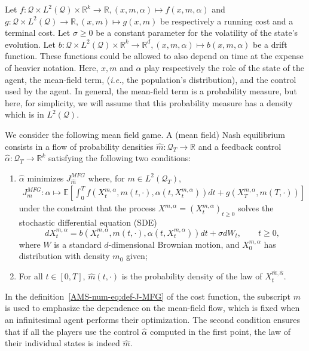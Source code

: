 \documentclass{amsproc}
\theoremstyle{definition}
\theoremstyle{remark}
\numberwithin{equation}{section}
\newcommand{\EE}{{\mathbb E}}
\newcommand{\RR}{{\mathbb R}}
\newcommand{\ctrl}{\alpha}
\newcommand{\ctrldim}{k}
\newcommand{\dom}{\mathcal{Q}}
\newcommand{\domT}{\mathcal{Q}_{T}}
\begin{document}
Let $f: \dom \times L^2(\dom) \times \RR^\ctrldim \to \RR, (x,m,\ctrl) \mapsto f(x,m,\ctrl)$ and $g: \dom \times L^2(\dom) \to \RR, (x,m) \mapsto g(x,m)$ be respectively a running cost and a terminal cost. Let $\sigma \ge 0$ be a constant parameter for the volatility of the state's evolution.  Let $b:  \dom \times L^2(\dom) \times \RR^\ctrldim \to \RR^d, (x,m,\ctrl) \mapsto b(x,m,\ctrl)$ be a drift function.  These functions could be allowed to also depend on time at the expense of heavier notation. Here, $x,m$ and $\ctrl$ play respectively the role of the state of the agent, the mean-field term, (\textit{i.e.}, the population's distribution), and the control used by the agent. In general, the mean-field term is a probability measure, but here, for simplicity, we will assume that this probability measure has a density which is in $L^2(\dom)$. 

We consider the following mean field game. A (mean field) Nash equilibrium consists in a flow of probability densities $\hat{m}: \domT \to \RR$ and a feedback control $\hat{\ctrl}: \domT\to \RR^\ctrldim$ satisfying the following two conditions:
\begin{enumerate}
	\item $\hat{\ctrl}$ minimizes $J^{MFG}_{\hat{m}}$ where, for $m \in L^2(\domT)$,
\begin{align}
\label{AMS-num-eq:def-J-MFG}
	J^{MFG}_{m}: \ctrl \mapsto  \EE \left[\int_0^T f(X_t^{m, \ctrl}, m(t, \cdot), \ctrl(t,X_t^{m, \ctrl}) ) dt + g(X_T^{m, \ctrl}, m(T,\cdot)) \right]
\end{align}
under the constraint that the  process $X^{m, \ctrl} = (X_t^{m, \ctrl})_{t \ge 0}$ solves the stochastic differential equation (SDE)
\begin{equation}
\label{AMS-num-eq:dyn-X-general-MFG}
	d X_t^{m, \ctrl} = b(X_t^{m, \ctrl}, m(t,\cdot), \ctrl(t, X_t^{m, \ctrl})) dt + \sigma d W_t, \qquad t \ge 0,
\end{equation}
where $W$ is a standard $d$-dimensional Brownian motion, and $X_0^{m, \ctrl}$ has distribution with density $m_0$ given;
	\item For all $t \in [0,T]$, $\hat{m}(t,\cdot)$ is the probability density of the law of $X_t^{\hat{m}, \hat{\ctrl}}$.
\end{enumerate}
In the definition~\eqref{AMS-num-eq:def-J-MFG} of the cost function, the subscript $m$ is used to emphasize the dependence on the mean-field flow, which is fixed when an infinitesimal agent performs their optimization. The second condition ensures that if all the players use the control $\hat{\ctrl}$ computed in the first point, the law of their individual states is indeed $\hat{m}$.
\end{document}
